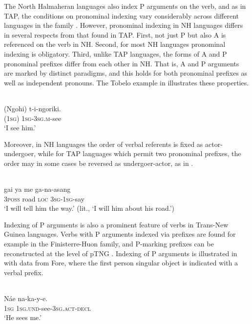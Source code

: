 The North Halmaheran languages also index P arguments on the verb, and as in TAP, the conditions on pronominal indexing vary considerably across different languages in the family \citep{Holton2008}. However, pronominal indexing in NH languages differs in several respects from that found in TAP. First, not just P but also A is referenced on the verb in NH. Second, for most NH languages pronominal indexing is obligatory. Third, unlike TAP languages, the forms of A and P pronominal prefixes differ from each other in NH. That is, A and P arguments are marked by distinct paradigms, and this holds for both pronominal prefixes as well as independent pronouns. The Tobelo example in  illustrates these properties.

\ea%
\label{ex:4:9}
 \\
\gll  (Ngohi) t-i-ngoriki. \\
    (\textsc{1sg}) \textsc{1sg-3sg.m}-see\\
\glt `I see him.'
\z





Moreover, in NH languages the order of verbal referents is fixed as actor-undergoer, while for TAP languages which permit two pronominal prefixes, the order may in some cases be reversed as undergoer-actor, as in .

\ea%
\label{ex:4:10}
 \\
\gll  gai ya me ga-na-asang \\
 \textsc{3poss} road \textsc{loc} \textsc{3sg-1sg}-say  \\
\glt `I will tell him the way.' (lit., `I will him about his road.')
\z

 



Indexing of P arguments is also a prominent feature of verbs in Trans-New Guinea languages. Verbs with P arguments indexed via prefixes are found for example in the Finisterre-Huon family, and P-marking prefixes can be reconstructed at the level of pTNG \citep{Suter2012}. Indexing of P arguments is illustrated in  with data from Fore, where the first person singular object is indicated with a verbal prefix.

\ea%
\label{ex:4:11}
 \\
\gll  N\'ae na-ka-y-e. \\
  1\textsc{sg} \textsc{1sg.und}-see-\textsc{3sg.act-decl}  \\
\glt `He sees me.'
\z





